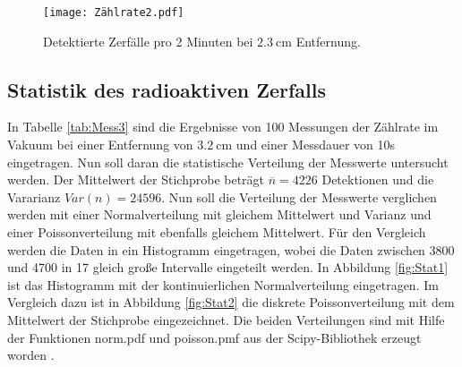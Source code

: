 \begin{figure}[H]
  \centering
  \texttt{[image: Zählrate2.pdf]}
  \caption{Detektierte Zerfälle pro 2 Minuten bei $\qty{2.3}{\centi\meter}$ Entfernung.}
  \label{fig:Rate2}
\end{figure}

\subsection{Statistik des radioaktiven Zerfalls}
In Tabelle \ref{tab:Mess3} sind die Ergebnisse von 100 Messungen der Zählrate im Vakuum bei einer
Entfernung von $\qty{3.2}{\centi\meter}$ und einer Messdauer von 10s eingetragen.
Nun soll daran die statistische Verteilung der Messwerte untersucht werden.
Der Mittelwert der Stichprobe beträgt $\overline{n}=4226$ Detektionen und die Vararianz $Var(n)=24596$.
Nun soll die Verteilung der Messwerte verglichen werden mit
einer Normalverteilung mit gleichem Mittelwert und Varianz und einer Poissonverteilung
mit ebenfalls gleichem Mittelwert.
Für den Vergleich werden die Daten in ein Histogramm eingetragen, wobei die Daten zwischen 3800 und
4700 in 17 gleich große Intervalle eingeteilt werden. In Abbildung \ref{fig:Stat1} ist das Histogramm mit der
kontinuierlichen Normalverteilung eingetragen. Im Vergleich dazu ist in Abbildung \ref{fig:Stat2} die diskrete
Poissonverteilung mit dem Mittelwert der Stichprobe eingezeichnet. Die beiden Verteilungen sind mit Hilfe der Funktionen
norm.pdf und poisson.pmf aus der Scipy-Bibliothek erzeugt worden \cite{scipy}. 
